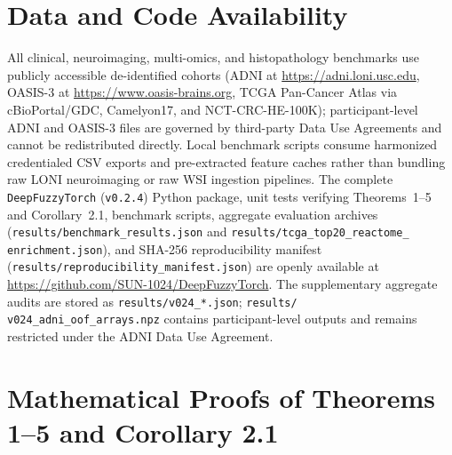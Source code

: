 \documentclass[10pt,twocolumn]{article}
\begin{document}
\section*{Data and Code Availability}
All clinical, neuroimaging, multi-omics, and histopathology benchmarks use publicly accessible
de-identified cohorts (ADNI at \url{https://adni.loni.usc.edu}, OASIS-3 at
\url{https://www.oasis-brains.org}, TCGA Pan-Cancer Atlas via cBioPortal/GDC, Camelyon17, and
NCT-CRC-HE-100K); participant-level ADNI and OASIS-3 files are governed by third-party Data Use
Agreements and cannot be redistributed directly. Local benchmark scripts consume harmonized
credentialed CSV exports and pre-extracted feature caches rather than bundling raw LONI
neuroimaging or raw WSI ingestion pipelines. The complete \texttt{DeepFuzzyTorch}
(\texttt{v0.2.4}) Python package, unit tests
verifying
Theorems~1--5 and Corollary~2.1, benchmark scripts, aggregate evaluation archives
(\texttt{results/\allowbreak benchmark\_\allowbreak results.json} and
\texttt{results/\allowbreak tcga\_\allowbreak top20\_\allowbreak reactome\_\allowbreak
enrichment.json}), and SHA-256 reproducibility manifest
(\texttt{results/\allowbreak reproducibility\_\allowbreak manifest.json}) are openly available
at \url{https://github.com/SUN-1024/DeepFuzzyTorch}. The supplementary aggregate audits are
stored as \texttt{results/v024\_*.json}; \texttt{results/\allowbreak
v024\_adni\_oof\_arrays.npz}
contains participant-level outputs and remains restricted under the ADNI Data Use Agreement.

\appendix
\section{Mathematical Proofs of Theorems 1--5 and Corollary 2.1}
\label{app:proofs}
\end{document}

